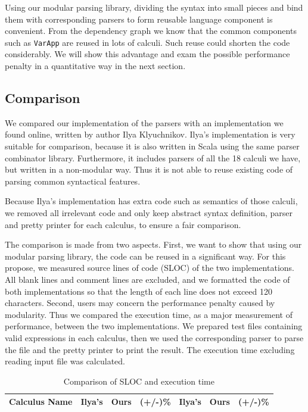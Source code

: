 Using our modular parsing library, dividing the syntax into small pieces and bind them with corresponding parsers to form reusable language component is convenient. From the dependency graph we know that the common components such as \lstinline{VarApp} are reused in lots of calculi. Such reuse could shorten the code considerably. We will show this advantage and exam the possible performance penalty in a quantitative way in the next section.

\subsection{Comparison}\label{subsec:cs-comparison}

We compared our implementation of the parsers with an implementation we found online, written by author Ilya Klyuchnikov. Ilya's implementation is very suitable for comparison, because it is also written in Scala using the same parser combinator library. Furthermore, it includes parsers of all the 18 calculi we have, but written in a non-modular way. Thus it is not able to reuse existing code of parsing common syntactical features.

Because Ilya's implementation has extra code such as semantics of those calculi, we removed all irrelevant code and only keep abstract syntax definition, parser and pretty printer for each calculus, to ensure a fair comparison.

The comparison is made from two aspects. First, we want to show that using our modular parsing library, the code can be reused in a significant way. For this propose, we measured source lines of code (SLOC) of the two implementations. All blank lines and comment lines are excluded, and we formatted the code of both implementations so that the length of each line does not exceed 120 characters. Second, users may concern the performance penalty caused by modularity. Thus we compared the execution time, as a major measurement of performance, between the two implementations. We prepared test files containing valid expressions in each calculus, then we used the corresponding parser to parse the file and the pretty printer to print the result. The execution time excluding reading input file was calculated.

\begin{table}
    \centering
    \begin{tabular}{|l|r|r|r|r|r|r|}
      \hline
      \bfseries Calculus Name & \bfseries Ilya's & \bfseries Ours & \bfseries (+/-)\% & \bfseries Ilya's & \bfseries Ours & \bfseries (+/-)\% \\
      \hline
      
      \hline
    \end{tabular}
    \caption{Comparison of SLOC and execution time}
    \label{tab:comparison}
\end{table}

